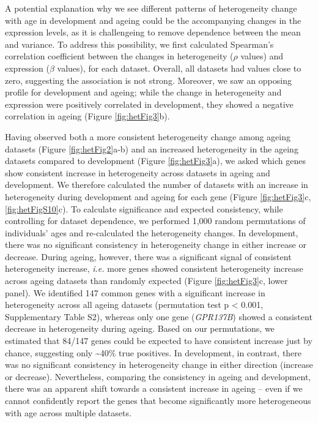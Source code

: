 \documentclass[12pt,twoside]{unicam}
\begin{document}
A potential explanation why we see different patterns of heterogeneity change with age in development and ageing could be the accompanying changes in the expression levels, as it is challengeing to remove dependence between the mean and variance. To address this possibility, we first calculated Spearman's correlation coefficient between the changes in heterogeneity (\(\rho\) values) and expression (\(\beta\) values), for each dataset. Overall, all datasets had values close to zero, suggesting the association is not strong. Moreover, we saw an opposing profile for development and ageing; while the change in heterogeneity and expression were positively correlated in development, they showed a negative correlation in ageing (Figure \ref{fig:hetFig3}b).

Having observed both a more consistent heterogeneity change among ageing datasets (Figure \ref{fig:hetFig2}a-b) and an increased heterogeneity in the ageing datasets compared to development (Figure \ref{fig:hetFig3}a), we asked which genes show consistent increase in heterogeneity across datasets in ageing and development. We therefore calculated the number of datasets with an increase in heterogeneity during development and ageing for each gene (Figure \ref{fig:hetFig3}c, \ref{fig:hetFigS10}c). To calculate significance and expected consistency, while controlling for dataset dependence, we performed 1,000 random permutations of individuals' ages and re-calculated the heterogeneity changes. In development, there was no significant consistency in heterogeneity change in either increase or decrease. During ageing, however, there was a significant signal of consistent heterogeneity increase, \emph{i.e.} more genes showed consistent heterogeneity increase across ageing datasets than randomly expected (Figure \ref{fig:hetFig3}c, lower panel). We identified 147 common genes with a significant increase in heterogeneity across all ageing datasets (permutation test p \textless{} 0.001, Supplementary Table S2), whereas only one gene (\emph{GPR137B}) showed a consistent decrease in heterogeneity during ageing. Based on our permutations, we estimated that 84/147 genes could be expected to have consistent increase just by chance, suggesting only \textasciitilde40\% true positives. In development, in contrast, there was no significant consistency in heterogeneity change in either direction (increase or decrease). Nevertheless, comparing the consistency in ageing and development, there was an apparent shift towards a consistent increase in ageing -- even if we cannot confidently report the genes that become significantly more heterogeneous with age across multiple datasets.
\end{document}
